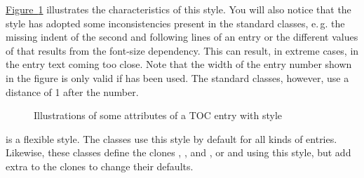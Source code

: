 \begin{description}
  \hyperref[fig:tocbasic.largetocline]%
  {Figure~\ref*{fig:tocbasic.largetocline}} illustrates the characteristics of
  this style. You will also notice that the style has adopted some
  inconsistencies present in the standard classes, e.\,g. the missing indent
  of the second and following lines of an entry or the different values of
   that results from the font-size dependency. This can
  result, in extreme cases, in the entry text coming too close. Note that the
  width of the entry number shown in the figure is only valid if
   has been used. The standard classes,
  however, use a distance of 1 after the number.
  \begin{figure}
    \centering
    \caption{Illustrations of some attributes of a TOC entry with style 
      }
    \label{fig:tocbasic.largetocline}
  \end{figure}
\item[\PValue{tocline}] is a flexible style. The \KOMAScript{} classes use
  this style by default for all kinds of entries. Likewise, these classes
  define the clones , , and , or
   and  using this style, but add extra
   to the clones to change their defaults.


\end{description}
